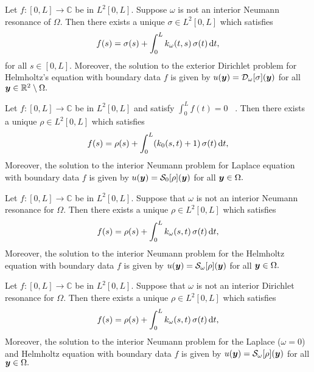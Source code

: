 \begin{theorem} 
Let $f:[0,L] \rightarrow \mathbb{C}$ be in $L^{2}[0,L]$. Suppose $\omega$ is not an interior Neumann resonance of $\Omega$. Then there exists a unique $\sigma \in L^{2}[0,L]$ which
satisfies
\begin{align}
f(s)=  \sigma(s)+ \int_0^L k_{\omega}(t,s) \,\sigma(t)\,{\rm d}t,
\end{align}
for all $s \in [0,L].$ 
Moreover, the solution to the exterior Dirichlet problem for Helmholtz's equation with boundary data $f$ is given by $u(\boldsymbol{y}) = \mathcal{D}_{\omega}[\sigma](\boldsymbol{y})$
for all $\boldsymbol{y} \in \mathbb{R}^2 \setminus \Omega.$
\end{theorem}


\begin{theorem}
Let $f:[0,L] \rightarrow \mathbb{C}$ be in $L^{2}[0,L]$ and satisfy $\int_{0}^{L} f(t) = 0$ \, .
Then there exists a unique $\rho \in L^{2}[0,L]$ which satisfies
\begin{align}
f(s)=  \rho(s)+ \int_0^L (k_{0}(s,t) + 1)\,\sigma(t)\,{\rm d}t,
\label{bie_intd}
\end{align}
Moreover, the solution to the interior Neumann problem for Laplace equation with boundary data $f$ is given by $u(\boldsymbol{y}) = \mathcal{S}_{0}[\rho](\boldsymbol{y})$ for all $\boldsymbol{y} \in \Omega.$
\end{theorem}

\begin{theorem}
Let $f:[0,L] \rightarrow \mathbb{C}$ be in $L^{2}[0,L]$. Suppose that $\omega$ is not an interior Neumann resonance for 
$\Omega$. 
Then there exists a unique $\rho \in L^{2}[0,L]$ which satisfies
\begin{align}
f(s)=  \rho(s)+ \int_0^L k_{\omega}(s,t) \,\sigma(t)\,{\rm d}t,
\label{bie_intd}
\end{align}
Moreover, the solution to the interior Neumann problem for the Helmholtz equation with boundary data $f$ is given by $u(\boldsymbol{y}) = \mathcal{S}_{\omega}[\rho](\boldsymbol{y})$ for all $\boldsymbol{y} \in \Omega.$
\end{theorem}



\begin{theorem}
Let $f:[0,L] \rightarrow \mathbb{C}$ be in $L^{2}[0,L]$. Suppose that $\omega$ is not an interior Dirichlet resonance for 
$\Omega$. 
Then there exists a unique $\rho \in L^{2}[0,L]$ which satisfies
\begin{align}
f(s)=  \rho(s)+ \int_0^L k_{\omega}(s,t) \,\sigma(t)\,{\rm d}t,
\label{bie_intd}
\end{align}
Moreover, the solution to the interior Neumann problem for the Laplace ($\omega =0$) and Helmholtz equation with boundary data $f$ is given by $u(\boldsymbol{y}) = \mathcal{S}_{\omega}[\rho](\boldsymbol{y})$ for all $\boldsymbol{y} \in \Omega.$
\end{theorem}

